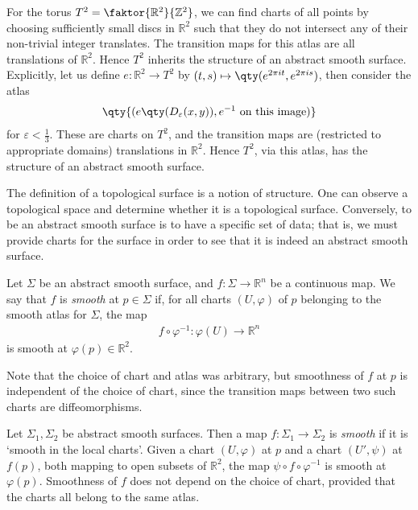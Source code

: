 \begin{example}
	For the torus $T^2 = \faktor{\mathbb R^2}{\mathbb Z^2}$, we can find charts of all points by choosing sufficiently small discs in $\mathbb R^2$ such that they do not intersect any of their non-trivial integer translates.
	The transition maps for this atlas are all translations of $\mathbb R^2$.
	Hence $T^2$ inherits the structure of an abstract smooth surface.
	Explicitly, let us define $e \colon \mathbb R^2 \to T^2$ by $(t,s) \mapsto \qty(e^{2\pi i t}, e^{2 \pi i s})$, then consider the atlas
	\begin{align*}
		\qty{(e\qty(D_\varepsilon(x,y)), e^{-1} \text{ on this image})}
	\end{align*}
	for $\varepsilon < \frac{1}{3}$.
	These are charts on $T^2$, and the transition maps are (restricted to appropriate domains) translations in $\mathbb R^2$.
	Hence $T^2$, via this atlas, has the structure of an abstract smooth surface.
\end{example}
\begin{remark}
	The definition of a topological surface is a notion of structure.
	One can observe a topological space and determine whether it is a topological surface.
	Conversely, to be an abstract smooth surface is to have a specific set of data; that is, we must provide charts for the surface in order to see that it is indeed an abstract smooth surface.
\end{remark}
\begin{definition}
	Let $\Sigma$ be an abstract smooth surface, and $f \colon \Sigma \to \mathbb R^n$ be a continuous map.
	We say that $f$ is \textit{smooth} at $p \in \Sigma$ if, for all charts $(U, \varphi)$ of $p$ belonging to the smooth atlas for $\Sigma$, the map
	\begin{align*}
		f \circ \varphi^{-1} \colon \varphi(U) \to \mathbb R^n
	\end{align*}
	is smooth at $\varphi(p) \in \mathbb R^2$.
\end{definition}
\begin{remark}
	Note that the choice of chart and atlas was arbitrary, but smoothness of $f$ at $p$ is independent of the choice of chart, since the transition maps between two such charts are diffeomorphisms.
\end{remark}
\begin{definition}
	Let $\Sigma_1, \Sigma_2$ be abstract smooth surfaces.
	Then a map $f \colon \Sigma_1 \to \Sigma_2$ is \textit{smooth} if it is `smooth in the local charts'.
	Given a chart $(U, \varphi)$ at $p$ and a chart $(U', \psi)$ at $f(p)$, both mapping to open subsets of $\mathbb R^2$, the map $\psi \circ f \circ \varphi^{-1}$ is smooth at $\varphi(p)$.
	Smoothness of $f$ does not depend on the choice of chart, provided that the charts all belong to the same atlas.
\end{definition}
